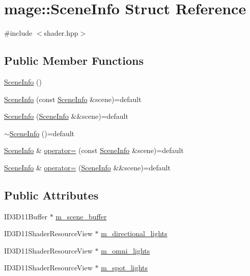 \hypertarget{structmage_1_1_scene_info}{}\section{mage\+:\+:Scene\+Info Struct Reference}
\label{structmage_1_1_scene_info}


{\ttfamily \#include $<$shader.\+hpp$>$}

\subsection*{Public Member Functions}
\begin{DoxyCompactItemize}
\item 
\hyperlink{structmage_1_1_scene_info_a8e5b36e32f72ab71aca27f213604e232}{Scene\+Info} ()
\item 
\hyperlink{structmage_1_1_scene_info_a8865f17176d3ec4592348bfa9ea40b66}{Scene\+Info} (const \hyperlink{structmage_1_1_scene_info}{Scene\+Info} \&scene)=default
\item 
\hyperlink{structmage_1_1_scene_info_a65fcf70d034db7f6d1153971a39af6f8}{Scene\+Info} (\hyperlink{structmage_1_1_scene_info}{Scene\+Info} \&\&scene)=default
\item 
\hyperlink{structmage_1_1_scene_info_ae35c1c6c36aa0bfa8794f2aeb5e10636}{$\sim$\+Scene\+Info} ()=default
\item 
\hyperlink{structmage_1_1_scene_info}{Scene\+Info} \& \hyperlink{structmage_1_1_scene_info_a785e7ad1ec491dbb657d2f2d11ed77bc}{operator=} (const \hyperlink{structmage_1_1_scene_info}{Scene\+Info} \&scene)=default
\item 
\hyperlink{structmage_1_1_scene_info}{Scene\+Info} \& \hyperlink{structmage_1_1_scene_info_a61dea73dc9c2f3ca7fdfe70f9bee33ac}{operator=} (\hyperlink{structmage_1_1_scene_info}{Scene\+Info} \&\&scene)=default
\end{DoxyCompactItemize}
\subsection*{Public Attributes}
\begin{DoxyCompactItemize}
\item 
I\+D3\+D11\+Buffer $\ast$ \hyperlink{structmage_1_1_scene_info_a9f2dda2382ece506438684848c019447}{m\+\_\+scene\+\_\+buffer}
\item 
I\+D3\+D11\+Shader\+Resource\+View $\ast$ \hyperlink{structmage_1_1_scene_info_ac939ab198820a49cbbb16f661b07bee7}{m\+\_\+directional\+\_\+lights}
\item 
I\+D3\+D11\+Shader\+Resource\+View $\ast$ \hyperlink{structmage_1_1_scene_info_adff390c6f7b8aee3cee4d799cfe10ea7}{m\+\_\+omni\+\_\+lights}
\item 
I\+D3\+D11\+Shader\+Resource\+View $\ast$ \hyperlink{structmage_1_1_scene_info_a531d21ed313faf3c786501d04dd62289}{m\+\_\+spot\+\_\+lights}
\end{DoxyCompactItemize}


